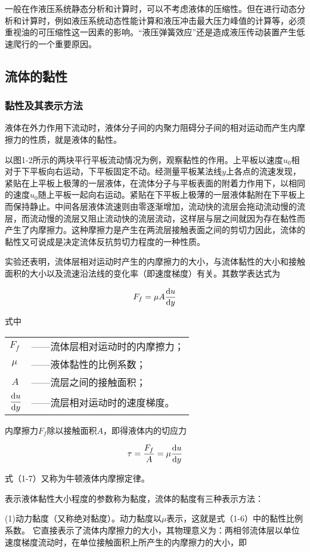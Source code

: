 一般在作液压系统静态分析和计算时，可以不考虑液体的压缩性。但在进行动态分析和计算时，例如液压系统动态性能计算和液压冲击最大压力峰值的计算等，必须重视油的可压缩性这一因素的影响。“液压弹簧效应”还是造成液压传动装置产生低速爬行的一个重要原因。

\subsection{流体的黏性}
\subsubsection{黏性及其表示方法}
液体在外力作用下流动时，液体分子间的内聚力阻碍分子间的相对运动而产生内摩擦力的性质，就是液体的黏性。

以图1-2所示的两块平行平板流动情况为例，观察黏性的作用。上平板以速度$u_0$相对于下平板向右运动，下平板固定不动。经测量平板某法线$y$上各点的流速发现，紧贴在上平板上极薄的一层液体，在流体分子与平板表面的附着力作用下，以相同的速度$u_0$随上平板一起向右运动。紧贴在下平板上极薄的一层液体黏附在下平板上而保持静止。中间各层液体流速则由零逐渐增加，流动快的流层会拖动流动慢的流层，而流动慢的流层又阻止流动快的流层流动，这样层与层之间就因为存在黏性而产生了内摩擦力。这种摩擦力是产生在两流层接触表面之间的剪切力因此，流体的黏性又可说成是决定流体反抗剪切力程度的一种性质。

实验还表明，流体层相对运动时产生的内摩擦力的大小，与流体黏性的大小和接触面积的大小以及流速沿法线的变化率（即速度梯度）有关。其数学表达式为

\begin{equation}
    F_f=\mu A\frac{{\rm d}u}{{\rm d}y}
\end{equation}

\noindent 式中\quad %
\begin{tabular}[t]{p{1mm}l}
    $F_f$&——流体层相对运动时的内摩擦力；\\
    $\ \mu $&——液体黏性的比例系数；\\
    $\ A $&——流层之间的接触面积；\\
    $\displaystyle\frac{{\rm d}u}{{\rm d}y}$&——流层相对运动时的速度梯度。
\end{tabular}

内摩擦力$F_f$除以接触面积$A$，即得液体内的切应力

\begin{equation}
    \tau =\frac{F_f}{A}=\mu \frac{{\rm d}u}{{\rm d}y}
\end{equation}

\noindent 式（1-7）又称为牛顿液体内摩擦定律。

表示液体黏性大小程度的参数称为黏度，流体的黏度有三种表示方法：

(1)动力黏度（又称绝对黏度）。动力黏度以$\mu $表示，这就是式（1-6）中的黏性比例系数。
它直接表示了流体内摩擦力的大小，其物理意义为：两相邻流体层以单位速度梯度流动时，在单位接触面积上所产生的内摩擦力的大小，即